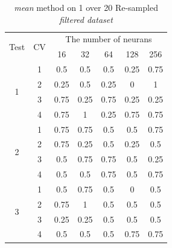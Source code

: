 \documentclass[draft,dvipsnames]{drexel-thesis}
\begin{document}
\begin{thesis}
\begin{table}[!t]
\centering
\caption{{\em mean} method on 1 over 20 Re-sampled {\em filtered dataset}}
\label{tbl:mean_1_20}
\begin{tabular}{|c|c|c|c|c|c|c|}
\hline
\multirow{2}{*}{Test} & \multirow{2}{*}{CV} & \multicolumn{5}{c|}{The number of neurans}                           \\ \cline{3-7}
                      &                     & 16       & 32           & 64           & 128          & 256          \\ \hline
\multirow{4}{*}{1}    & 1                   & 0.5      & 0.5          & 0.5          & 0.25         & 0.75         \\ \cline{2-7}
                      & 2                   & 0.25     & 0.5          & 0.25         & 0            & 1            \\ \cline{2-7}
                      & 3                   & 0.75     & 0.25         & 0.75         & 0.25         & 0.25         \\ \cline{2-7}
                      & 4                   & 0.75     & 1            & 0.25         & 0.75         & 0.75         \\ \hline
\multirow{4}{*}{2}    & 1                   & 0.75     & 0.75         & 0.5          & 0.5          & 0.75         \\ \cline{2-7}
                      & 2                   & 0.75     & 0.25         & 0.5          & 0.25         & 0.5          \\ \cline{2-7}
                      & 3                   & 0.5      & 0.75         & 0.75         & 0.5          & 0.25         \\ \cline{2-7}
                      & 4                   & 0.5      & 0.5          & 0.75         & 0.5          & 0.75         \\ \hline
\multirow{4}{*}{3}    & 1                   & 0.5      & 0.75         & 0.5          & 0            & 0.5          \\ \cline{2-7}
                      & 2                   & 0.75     & 1            & 0.5          & 0.5          & 0.5          \\ \cline{2-7}
                      & 3                   & 0.25     & 0.25         & 0.5          & 0.5          & 0.5          \\ \cline{2-7}
                      & 4                   & 0.5      & 0.5          & 0.5          & 0.75         & 0.75         \\ \hline

\end{tabular}
\end{table}
\end{thesis}
\end{document}
